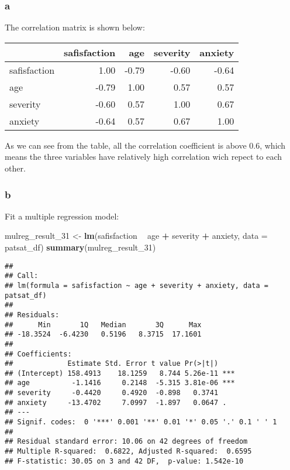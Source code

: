 \documentclass[]{article}
\newenvironment{Shaded}{\begin{snugshade}}{\end{snugshade}}
\newcommand{\KeywordTok}[1]{\textcolor[rgb]{0.13,0.29,0.53}{\textbf{#1}}}
\newcommand{\DataTypeTok}[1]{\textcolor[rgb]{0.13,0.29,0.53}{#1}}
\newcommand{\DecValTok}[1]{\textcolor[rgb]{0.00,0.00,0.81}{#1}}
\newcommand{\StringTok}[1]{\textcolor[rgb]{0.31,0.60,0.02}{#1}}
\newcommand{\OperatorTok}[1]{\textcolor[rgb]{0.81,0.36,0.00}{\textbf{#1}}}
\newcommand{\NormalTok}[1]{#1}
\begin{document}
\subsubsection{a}\label{a-2}

The correlation matrix is shown below:

\begin{Shaded}
\end{Shaded}

\begin{longtable}[]{@{}lrrrr@{}}
\toprule
& safisfaction & age & severity & anxiety\tabularnewline
\midrule
\endhead
safisfaction & 1.00 & -0.79 & -0.60 & -0.64\tabularnewline
age & -0.79 & 1.00 & 0.57 & 0.57\tabularnewline
severity & -0.60 & 0.57 & 1.00 & 0.67\tabularnewline
anxiety & -0.64 & 0.57 & 0.67 & 1.00\tabularnewline
\bottomrule
\end{longtable}

As we can see from the table, all the correlation coefficient is above
0.6, which means the three variables have relatively high correlation
wich repect to each other.

\subsubsection{b}\label{b-2}

Fit a multiple regression model:

\begin{Shaded}
\begin{Highlighting}[]
\NormalTok{mulreg_result_}\DecValTok{31}\NormalTok{ <-}\StringTok{ }\KeywordTok{lm}\NormalTok{(safisfaction }\OperatorTok{~}\StringTok{ }\NormalTok{age }\OperatorTok{+}\StringTok{ }\NormalTok{severity }\OperatorTok{+}\StringTok{ }\NormalTok{anxiety, }\DataTypeTok{data =}\NormalTok{ patsat_df)}
\KeywordTok{summary}\NormalTok{(mulreg_result_}\DecValTok{31}\NormalTok{)}
\end{Highlighting}
\end{Shaded}

\begin{verbatim}
## 
## Call:
## lm(formula = safisfaction ~ age + severity + anxiety, data = patsat_df)
## 
## Residuals:
##      Min       1Q   Median       3Q      Max 
## -18.3524  -6.4230   0.5196   8.3715  17.1601 
## 
## Coefficients:
##             Estimate Std. Error t value Pr(>|t|)    
## (Intercept) 158.4913    18.1259   8.744 5.26e-11 ***
## age          -1.1416     0.2148  -5.315 3.81e-06 ***
## severity     -0.4420     0.4920  -0.898   0.3741    
## anxiety     -13.4702     7.0997  -1.897   0.0647 .  
## ---
## Signif. codes:  0 '***' 0.001 '**' 0.01 '*' 0.05 '.' 0.1 ' ' 1
## 
## Residual standard error: 10.06 on 42 degrees of freedom
## Multiple R-squared:  0.6822, Adjusted R-squared:  0.6595 
## F-statistic: 30.05 on 3 and 42 DF,  p-value: 1.542e-10
\end{verbatim}
\end{document}
